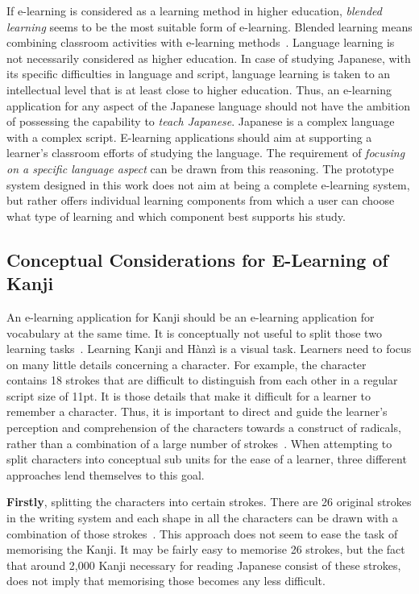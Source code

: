 If e-learning is considered as a learning method in higher education, 
\emph{blended learning} seems to be the most suitable form of e-learning.
Blended learning means combining classroom activities with e-learning 
methods~. Language learning is not 
necessarily considered as higher education. In case of studying Japanese,
with its specific difficulties in language and script, language learning
is taken to an intellectual level that is at least close to higher education.
Thus, an e-learning application for any aspect of the Japanese language 
should not have the ambition of possessing the capability 
to \emph{teach Japanese}. Japanese is a complex language with a complex script.
E-learning applications should aim at supporting a learner's 
classroom efforts of studying the language. The requirement of 
\emph{focusing on a specific language aspect} can be drawn from this reasoning.
The prototype system designed in this work does not aim at being a complete
e-learning system, but rather offers individual learning components from which 
a user can choose what type of learning and which component best supports his 
study.

\subsection{Conceptual Considerations for E-Learning of Kanji}
\label{sec:concept:conceptualconsiderationsforelearningofKanji}

An e-learning application for Kanji should be an e-learning application for
vocabulary at the same time. It is conceptually not useful to split those two 
learning tasks~.
Learning Kanji and Hànzì is a visual task. Learners need to focus on many little
details concerning a character. For example, the character~ contains 18 
strokes that are difficult to distinguish from each other in a regular script 
size of 11pt. It is those details that make it difficult for a learner to 
remember a character. Thus, it is important to direct and guide the learner's 
perception and comprehension of the characters towards a construct of radicals, 
rather than a combination of a large number of strokes~.
When attempting to split characters into conceptual sub units for the ease of
a learner, three different approaches lend themselves to this goal.

\textbf{Firstly}, splitting the characters into certain strokes. There are 26 
original strokes in the writing system and each shape in all the characters can 
be drawn with a combination of those strokes~.
This approach does not seem to ease the task of memorising the Kanji.
It may be fairly easy to memorise 26 strokes, but the fact that around 
2,000 Kanji necessary for reading Japanese consist of these strokes, does not
imply that memorising those becomes any less difficult.

